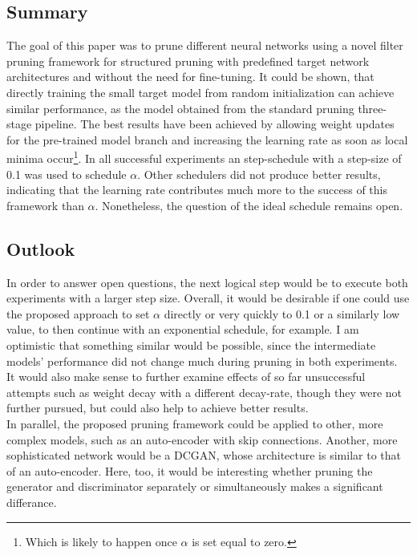 \documentclass[10pt,twocolumn,letterpaper]{article}
\begin{document}
\subsection{Summary}
The goal of this paper was to prune different neural networks using a novel filter pruning framework for structured pruning with predefined target network architectures and without the need for fine-tuning.
It could be shown, that directly training the small target model from random initialization can achieve similar performance, as the model obtained from the standard pruning three-stage pipeline.
The best results have been achieved by allowing weight updates for the pre-trained model branch and increasing the learning rate as soon as local minima occur\footnote{Which is likely to happen once $\alpha$ is set equal to zero.}.
In all successful experiments an step-schedule with a step-size of 0.1 was used to schedule $\alpha$.
Other schedulers did not produce better results, indicating that the learning rate contributes much more to the success of this framework than $\alpha$.
Nonetheless, the question of the ideal schedule remains open.

\subsection{Outlook}
In order to answer open questions, the next logical step would be to execute both experiments with a larger step size.
Overall, it would be desirable if one could use the proposed approach to set $\alpha$ directly or very quickly to 0.1 or a similarly low value, to then continue with an exponential schedule, for example.
I am optimistic that something similar would be possible, since the intermediate models' performance did not change much during pruning in both experiments.\\
It would also make sense to further examine effects of so far unsuccessful attempts such as weight decay with a different decay-rate, though they were not further pursued, but could also help to achieve better results.\\
In parallel, the proposed pruning framework could be applied to other, more complex models, such as an auto-encoder with skip connections.
Another, more sophisticated network would be a DCGAN, whose architecture is similar to that of an auto-encoder.
Here, too, it would be interesting whether pruning the generator and discriminator separately or simultaneously makes a significant differance.

\clearpage
\onecolumn
{\small
%


}
\end{document}
